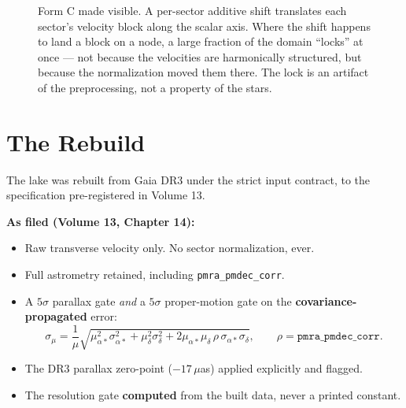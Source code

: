 \documentclass[11pt, letterpaper, openany]{book}
\begin{document}
\begin{figure}[H]
\centering
{}
\caption{Form C made visible. A per-sector additive shift translates each sector's velocity
block along the scalar axis. Where the shift happens to land a block on a node, a large fraction
of the domain ``locks'' at once --- not because the velocities are harmonically structured, but
because the normalization moved them there. The lock is an artifact of the preprocessing, not a
property of the stars.}
\end{figure}

\section{The Rebuild}

The lake was rebuilt from Gaia DR3 under the strict input contract, to the specification
pre-registered in Volume 13.

\begin{predictionbox}
\textbf{As filed (Volume 13, Chapter 14):}
\begin{itemize}
    \item Raw transverse velocity only. No sector normalization, ever.
    \item Full astrometry retained, including \texttt{pmra\_pmdec\_corr}.
    \item A $5\sigma$ parallax gate \emph{and} a $5\sigma$ proper-motion gate on the
          \textbf{covariance-propagated} error:
          \[
          \sigma_\mu = \frac{1}{\mu}\sqrt{\mu_{\alpha*}^2 \sigma_{\alpha*}^2
          + \mu_\delta^2 \sigma_\delta^2 + 2\mu_{\alpha*}\mu_\delta\,\rho\,
          \sigma_{\alpha*}\sigma_\delta},
          \qquad \rho = \texttt{pmra\_pmdec\_corr}.
          \]
    \item The DR3 parallax zero-point ($-17\,\mu$as) applied explicitly and flagged.
    \item The resolution gate \textbf{computed} from the built data, never a printed constant.
\end{itemize}
\end{predictionbox}
\end{document}

